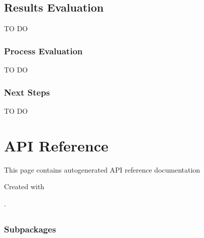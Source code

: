 \documentclass[letterpaper,10pt,english]{sphinxmanual}
\begin{document}
\section{Results Evaluation}
\label{\detokenize{evaluation:results-evaluation}}
TO DO


\subsection{Process Evaluation}
\label{\detokenize{evaluation:process-evaluation}}
TO DO


\subsection{Next Steps}
\label{\detokenize{evaluation:next-steps}}
TO DO


\chapter{API Reference}
\label{\detokenize{autoapi/index:api-reference}}\label{\detokenize{autoapi/index::doc}}
This page contains auto\sphinxhyphen{}generated API reference documentation %
\begin{footnote}[1]\sphinxAtStartFootnote
Created with 
%
\end{footnote}.


\section{}
\label{\detokenize{autoapi/src/index:module-src}}\label{\detokenize{autoapi/src/index:src}}\label{\detokenize{autoapi/src/index::doc}}

\subsection{Subpackages}
\label{\detokenize{autoapi/src/index:subpackages}}

\subsubsection{}
\label{\detokenize{autoapi/src/forecast/index:module-src.forecast}}\label{\detokenize{autoapi/src/forecast/index:src-forecast}}\label{\detokenize{autoapi/src/forecast/index::doc}}
\end{document}
